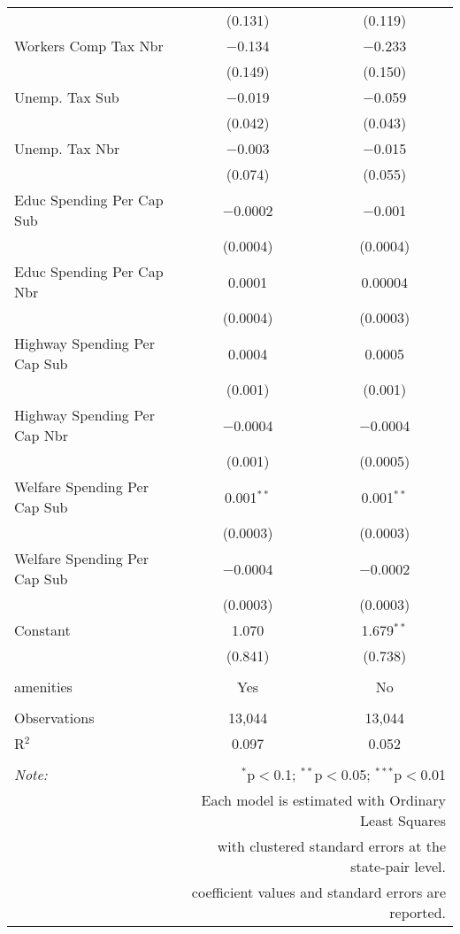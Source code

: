 \begin{table}[!htbp]
\begin{tabular}{@{\extracolsep{5pt}}lcc}
  & (0.131) & (0.119) \\ 
  Workers Comp Tax Nbr & $-$0.134 & $-$0.233 \\ 
  & (0.149) & (0.150) \\ 
  Unemp. Tax Sub & $-$0.019 & $-$0.059 \\ 
  & (0.042) & (0.043) \\ 
  Unemp. Tax Nbr & $-$0.003 & $-$0.015 \\ 
  & (0.074) & (0.055) \\ 
  Educ Spending Per Cap Sub & $-$0.0002 & $-$0.001 \\ 
  & (0.0004) & (0.0004) \\ 
  Educ Spending Per Cap Nbr & 0.0001 & 0.00004 \\ 
  & (0.0004) & (0.0003) \\ 
  Highway Spending Per Cap Sub & 0.0004 & 0.0005 \\ 
  & (0.001) & (0.001) \\ 
  Highway Spending Per Cap Nbr & $-$0.0004 & $-$0.0004 \\ 
  & (0.001) & (0.0005) \\ 
  Welfare Spending Per Cap Sub & 0.001$^{**}$ & 0.001$^{**}$ \\ 
  & (0.0003) & (0.0003) \\ 
  Welfare Spending Per Cap Sub & $-$0.0004 & $-$0.0002 \\ 
  & (0.0003) & (0.0003) \\ 
  Constant & 1.070 & 1.679$^{**}$ \\ 
  & (0.841) & (0.738) \\ 
 \hline \\[-1.8ex] 
amenities & Yes & No \\ 
\hline \\[-1.8ex] 
Observations & 13,044 & 13,044 \\ 
R$^{2}$ & 0.097 & 0.052 \\ 
\hline 
\hline \\[-1.8ex] 
\textit{Note:}  & \multicolumn{2}{r}{$^{*}$p$<$0.1; $^{**}$p$<$0.05; $^{***}$p$<$0.01} \\ 
 & \multicolumn{2}{r}{Each model is estimated with Ordinary Least Squares} \\ 
 & \multicolumn{2}{r}{with clustered standard errors at the state-pair level.} \\ 
 & \multicolumn{2}{r}{coefficient values and standard errors are reported.} \\ 
\end{tabular} 
\end{table} 
